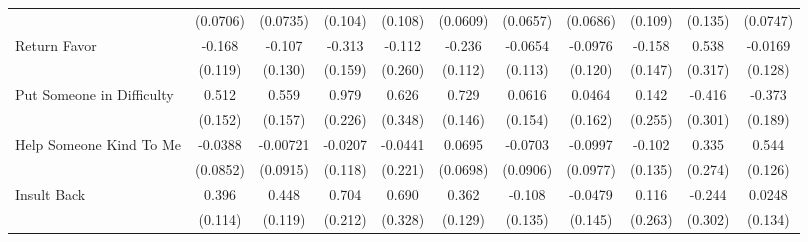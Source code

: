 {\begin{tabular}{l*{10}{c}}
            &    (0.0706)         &    (0.0735)         &     (0.104)         &     (0.108)         &    (0.0609)         &    (0.0657)         &    (0.0686)         &     (0.109)         &     (0.135)         &    (0.0747)         \\
\addlinespace
Return Favor&      -0.168         &      -0.107         &      -0.313\sym{*}  &      -0.112         &      -0.236\sym{*}  &     -0.0654         &     -0.0976         &      -0.158         &       0.538         &     -0.0169         \\
            &     (0.119)         &     (0.130)         &     (0.159)         &     (0.260)         &     (0.112)         &     (0.113)         &     (0.120)         &     (0.147)         &     (0.317)         &     (0.128)         \\
\addlinespace
Put Someone in Difficulty&       0.512\sym{***}&       0.559\sym{***}&       0.979\sym{***}&       0.626         &       0.729\sym{***}&      0.0616         &      0.0464         &       0.142         &      -0.416         &      -0.373\sym{*}  \\
            &     (0.152)         &     (0.157)         &     (0.226)         &     (0.348)         &     (0.146)         &     (0.154)         &     (0.162)         &     (0.255)         &     (0.301)         &     (0.189)         \\
\addlinespace
Help Someone Kind To Me&     -0.0388         &    -0.00721         &     -0.0207         &     -0.0441         &      0.0695         &     -0.0703         &     -0.0997         &      -0.102         &       0.335         &       0.544\sym{***}\\
            &    (0.0852)         &    (0.0915)         &     (0.118)         &     (0.221)         &    (0.0698)         &    (0.0906)         &    (0.0977)         &     (0.135)         &     (0.274)         &     (0.126)         \\
\addlinespace
Insult Back &       0.396\sym{***}&       0.448\sym{***}&       0.704\sym{***}&       0.690\sym{*}  &       0.362\sym{**} &      -0.108         &     -0.0479         &       0.116         &      -0.244         &      0.0248         \\
            &     (0.114)         &     (0.119)         &     (0.212)         &     (0.328)         &     (0.129)         &     (0.135)         &     (0.145)         &     (0.263)         &     (0.302)         &     (0.134)         \\
\bottomrule
\end{tabular}
}
